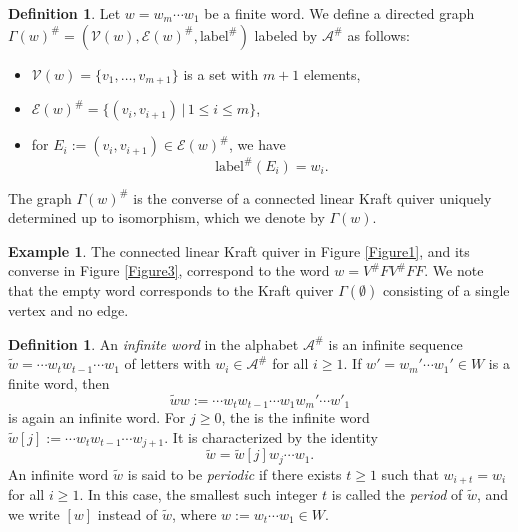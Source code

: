 \documentclass[12pt]{amsart}
\theoremstyle{definition}
\newtheorem{definition}[theorem]{Definition}
\newtheorem{example}[theorem]{Example}
\renewcommand{\tilde}{\widetilde}
\newcommand{\<}{\langle}   %
\renewcommand{\>}{\rangle} %
\begin{document}
\begin{definition}\label{DefLinearKraftQuiverWithWord}
    Let $w = w_m\cdots w_1$ be a finite word. We define a directed graph $\Gamma(w)^{\#} = (\mathcal V(w),\mathcal E(w)^{\#},\mathrm{label}^{\#})$ labeled by $\mathcal A^{\#}$ as follows:
    \begin{itemize}
        \item $\mathcal V(w) = \{v_1,\ldots , v_{m+1}\}$ is a set with $m+1$ elements,
        \item $\mathcal E(w)^{\#} = \{(v_i,v_{i+1}) \,|\, 1 \leq i \leq m\}$,
        \item for $E_i := (v_i,v_{i+1}) \in \mathcal E(w)^{\#}$, we have
        \begin{equation*}
            \mathrm{label}^{\#}(E_i) = w_i. 
        \end{equation*}
    \end{itemize}
    The graph $\Gamma(w)^{\#}$ is the converse of a connected linear Kraft quiver uniquely determined up to isomorphism, which we denote by $\Gamma(w)$. 
\end{definition}

\begin{example}
    The connected linear Kraft quiver in Figure \ref{Figure1}, and its converse in Figure \ref{Figure3}, correspond to the word $w = V^{\#}FV^{\#}FF$. We note that the empty word corresponds to the Kraft quiver $\Gamma(\emptyset)$ consisting of a single vertex and no edge.
\end{example}

\begin{definition}\label{DefinitionInfiniteWords}
    An \textit{infinite word} in the alphabet $\mathcal A^{\#}$ is an infinite sequence $\tilde w = \cdots w_t w_{t-1} \cdots w_1$ of letters with $w_i \in \mathcal A^{\#}$ for all $i\geq 1$. If $w' = w_m'\cdots w_1' \in W$ is a finite word, then 
    \begin{equation*}
        \tilde w w := \cdots w_tw_{t-1} \cdots w_1w_m'\cdots w'_1
    \end{equation*}
    is again an infinite word. For $j \geq 0$, the \text{$j$-shift of $\tilde w$} is the infinite word  $\tilde w[j] := \cdots w_{t}w_{t-1}\cdots w_{j+1}$. It is characterized by the identity 
    \begin{equation*}
        \tilde w = \tilde w[j] w_j\cdots w_1.
    \end{equation*}
    An infinite word $\tilde w$ is said to be \textit{periodic} if there exists $t \geq 1$ such that $w_{i+t} = w_i$ for all $i \geq 1$. In this case, the smallest such integer $t$ is called the \textit{period} of $\tilde w$, and we write $[w]$ instead of $\tilde w$, where $w := w_t\cdots w_1 \in W$.
\end{definition}
\end{document}

